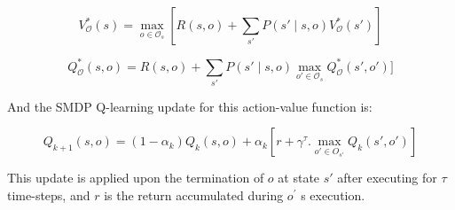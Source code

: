 \begin{equation}
    V_\mathcal{O}^* (s)=\max_{o \in  \mathcal{O}_s }⁡[R(s,o)  +\sum_{s'}P(s' \mid s,o) V_\mathcal{O}^* (s')]
\end{equation}

\begin{equation}
    Q_\mathcal{O}^* (s,o) = R(s,o) + \sum_{s'} P(s'\mid s,o)   \max_{o' \in \mathcal{O}_s } ⁡Q_\mathcal{O}^* (s',o')]
\end{equation}

And the SMDP Q-learning update for this action-value function is:

\begin{equation}
    Q_{k+1} (s,o)=(1-\alpha_k ) Q_k (s,o)+\alpha_k [r+ \gamma^\tau.   \max_{o' \in O_{s'}}⁡ Q_k (s',o' )]
\end{equation}


This update is applied upon the termination of \(o\) at state \(s'\) after executing for \(\tau\) time-steps, and \(r\) is the return accumulated during \(o^'\) s execution.  \\



